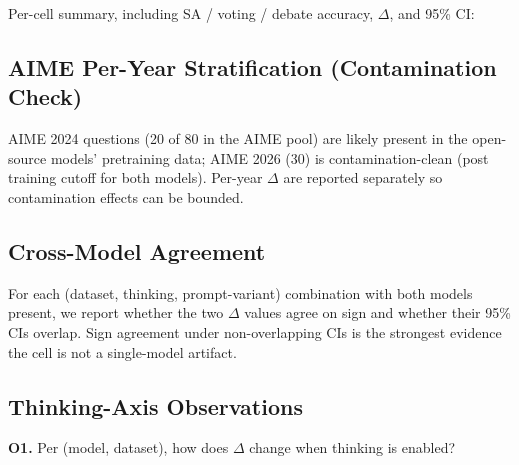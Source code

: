 \documentclass[11pt]{article}
\begin{document}
Per-cell summary, including SA / voting / debate accuracy, $\Delta$,
and 95\% CI:
\begin{center}
\end{center}

\subsection{AIME Per-Year Stratification (Contamination Check)}
\label{sec:aime-per-year}

AIME 2024 questions (20 of 80 in the AIME pool) are likely present in
the open-source models' pretraining data; AIME 2026 (30) is
contamination-clean (post training cutoff for both models). Per-year
$\Delta$ are reported separately so contamination effects can be
bounded.
\begin{center}
\end{center}

\subsection{Cross-Model Agreement}
\label{sec:cross-model}

For each (dataset, thinking, prompt-variant) combination with both
models present, we report whether the two $\Delta$ values agree on
sign and whether their 95\% CIs overlap. Sign agreement under
non-overlapping CIs is the strongest evidence the cell is not a
single-model artifact.
\begin{center}
\end{center}

\subsection{Thinking-Axis Observations}
\label{sec:thinking-axis}

\textbf{O1.} Per (model, dataset), how does $\Delta$ change when
thinking is enabled?
\begin{center}
\end{center}
\end{document}
